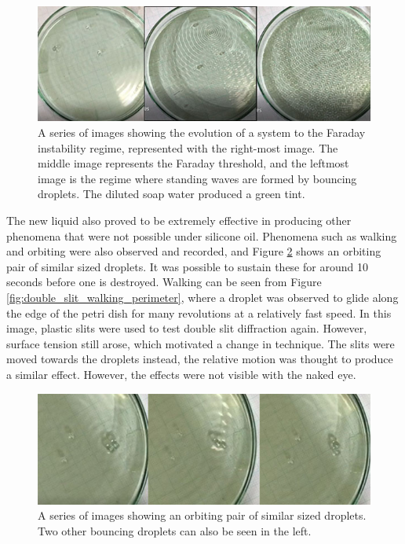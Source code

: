 \begin{figure}[htb]
\includegraphics[width=\textwidth]{prototype/exp_rep_imgs/Faraday_inst_regime.jpg}
\centering
\caption{A series of images showing the evolution of a system to the Faraday instability regime, represented with the right-most image. The middle image represents the Faraday threshold, and the leftmost image is the regime where standing waves are formed by bouncing droplets. The diluted soap water produced a green tint.}
\centering
\label{fig:faraday_inst_regime}
\end{figure}

The new liquid also proved to be extremely effective in producing other phenomena that were not possible under silicone oil. Phenomena such as walking and orbiting were also observed and recorded, and Figure \ref{fig:orbit_droplets_interaction} shows an orbiting pair of similar sized droplets. It  was possible to sustain these for around 10 seconds before one is destroyed. Walking can be seen from Figure \ref{fig:double_slit_walking_perimeter}, where a droplet was observed to glide along the edge of the petri dish for many revolutions at a relatively fast speed. In this image, plastic slits were used to test double slit diffraction again. However, surface tension still arose, which motivated a change in technique. The slits were moved towards the droplets instead, the relative motion was thought to produce a similar effect. However, the effects were not visible with the naked eye.

\begin{figure}[htb]
\includegraphics[width=\textwidth]{prototype/exp_rep_imgs/orbit_droplets_interaction.jpg}
\centering
\caption{A series of images showing an orbiting pair of similar sized droplets. Two other bouncing droplets can also be seen in the left.}
\centering
\label{fig:orbit_droplets_interaction}
\end{figure}

